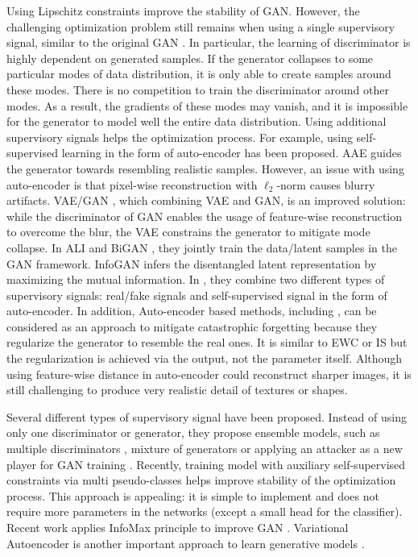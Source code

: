 \documentclass{article}
\begin{document}
Using Lipschitz constraints improve the stability of GAN. However, the challenging optimization problem still remains when using a single supervisory signal, similar to the  original GAN \cite{goodfellow-nisp-2014}. In particular, the learning of discriminator is highly dependent on generated samples. If the generator collapses to some particular modes of data distribution, it is only able to create samples around these modes. 
There is no competition to train the discriminator around other modes. As a result, the gradients of these modes may vanish, and it is impossible for the generator to model well the entire data distribution. Using additional supervisory signals helps the optimization process. For example, using self-supervised learning in the form of auto-encoder has been proposed. AAE \cite{makhzani-arxiv-2015} guides the generator towards resembling realistic samples. 
However, an issue with using auto-encoder is that pixel-wise reconstruction with $\ell_2$-norm causes blurry artifacts. VAE/GAN \cite{larsen-arxiv-2015}, which combining  VAE \cite{kingma-arxiv-2013} and GAN, is an improved solution: while the discriminator of GAN enables the usage of feature-wise reconstruction to overcome the blur, the VAE constrains the generator to mitigate mode collapse. In ALI \cite{dumoulin-arxiv-2016} and BiGAN \cite{donahue-arxiv-2016}, they jointly train the data/latent samples in the GAN framework. InfoGAN \cite{chen-arxiv-2016} infers the disentangled latent representation by maximizing the mutual information. In \cite{tran-eccv-2018,tran-aaai-2018}, they  combine two different types of supervisory signals: real/fake signals and self-supervised signal in the form of auto-encoder.  In addition, Auto-encoder based methods, including \cite{larsen-arxiv-2015,tran-eccv-2018,tran-aaai-2018},  can be considered as an approach  to mitigate catastrophic forgetting because they  regularize the generator to resemble the real ones. It is similar to EWC \cite{kirkpatrick-2017-nas} or IS \cite{zenke-arxiv-2017} but the regularization is achieved via the output, not the parameter itself. Although using feature-wise distance in auto-encoder could reconstruct sharper images, it is  still challenging to produce very realistic detail of textures or shapes.

Several different types of supervisory signal have been proposed. Instead of using only one discriminator or generator, they propose ensemble models, such as multiple discriminators \cite{tu-nips-2017}, mixture of generators \cite{hoang-arxiv-2018,ghosh-cvpr-2018} or applying an attacker as a new player for GAN training \cite{liu-cvpr-2019}. Recently, training model with auxiliary self-supervised constraints \cite{chen-arxiv-2018,tran-arxiv-2019} via multi pseudo-classes \cite{gidaris-iclr-2018} helps improve stability of the  optimization process. This approach is appealing: it is simple to implement and does not require more parameters in the networks (except a small head for the classifier).
Recent work applies InfoMax principle to improve GAN \cite{kwotsin:2019}.  Variational Autoencoder is  another important approach to learn generative models \cite{kingma-arxiv-2013,Yang_2019_ICCV}.
\end{document}
